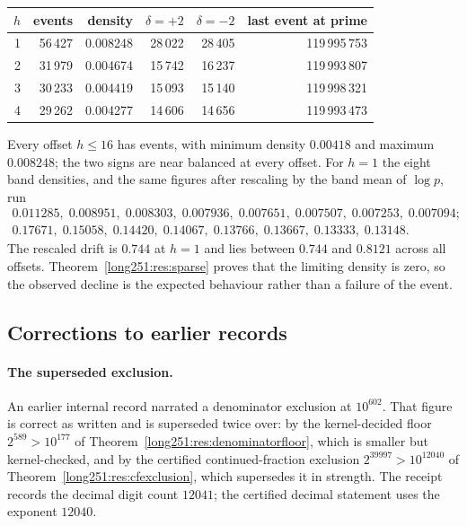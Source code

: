 \documentclass[11pt]{article}
\begin{document}
\begin{center}
\small
\begin{tabular}{@{}rrrrrr@{}}
\toprule
$h$ & events & density & $\delta=+2$ & $\delta=-2$ & last event at prime\\
\midrule
1 & 56\,427 & 0.008248 & 28\,022 & 28\,405 & 119\,995\,753\\
2 & 31\,979 & 0.004674 & 15\,742 & 16\,237 & 119\,993\,807\\
3 & 30\,233 & 0.004419 & 15\,093 & 15\,140 & 119\,998\,321\\
4 & 29\,262 & 0.004277 & 14\,606 & 14\,656 & 119\,993\,473\\
\bottomrule
\end{tabular}
\end{center}

Every offset $h\le16$ has events, with minimum density $0.00418$ and maximum
$0.008248$; the two signs are near balanced at every offset.  For $h=1$ the
eight band densities, and the same figures after rescaling by the band mean of
$\log p$, run
\[
\begin{array}{l}
 0.011285,\;0.008951,\;0.008303,\;0.007936,\;0.007651,\;0.007507,\;0.007253,\;0.007094;\\[2pt]
 0.17671,\;0.15058,\;0.14420,\;0.14067,\;0.13766,\;0.13667,\;0.13333,\;0.13148 .
\end{array}
\]
The rescaled drift is $0.744$ at $h=1$ and lies between $0.744$ and $0.8121$
across all offsets.  Theorem~\ref{long251:res:sparse} proves that the limiting density
is zero, so the observed decline is the expected behaviour rather than a
failure of the event.

\subsection{Corrections to earlier records}\label{long251:sec:xr-corrections}

\paragraph{The superseded exclusion.}  An earlier internal record narrated a
denominator exclusion at $10^{602}$.  That figure is correct as written and is
superseded twice over: by the kernel-decided floor $2^{589}>10^{177}$ of
Theorem~\ref{long251:res:denominatorfloor}, which is smaller but kernel-checked, and by
the certified continued-fraction exclusion $2^{39997}>10^{12040}$ of
Theorem~\ref{long251:res:cfexclusion}, which supersedes it in strength.  The receipt
records the decimal digit count $12041$; the certified decimal statement uses
the exponent $12040$.
\end{document}
